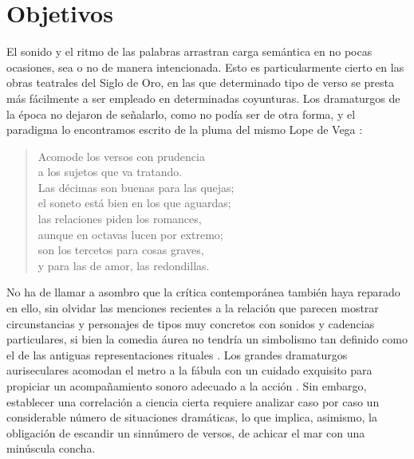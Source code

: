 \section{Objetivos}
El sonido y el ritmo de las palabras arrastran carga semántica en no pocas ocasiones, sea o no de manera intencionada. Esto es particularmente cierto en las obras teatrales del Siglo de Oro, en las que determinado tipo de verso se presta más fácilmente a ser empleado en determinadas coyunturas. Los dramaturgos de la época no dejaron de señalarlo, como no podía ser de otra forma, y el paradigma lo encontramos escrito de la pluma del mismo Lope de Vega \parencite*[305-312]{vega2006}: 
\blockquote{Acomode los versos con prudencia\\
	a los sujetos que va tratando.\\
	Las décimas son buenas para las quejas;\\
	el soneto está bien en los que aguardas;\\
	las relaciones piden los romances,\\
	aunque en octavas lucen por extremo;\\
	son los tercetos para cosas graves,\\
	y para las de amor, las redondillas.}
No ha de llamar a asombro que la crítica contemporánea también haya reparado en ello, sin olvidar las menciones recientes a la relación que parecen mostrar circunstancias y personajes de tipos muy concretos con sonidos \parencites{kroll2020a,kroll2019a}[36]{dominguez2005} y cadencias \parencite{sanchez2017} particulares, si bien la comedia áurea no tendría un simbolismo tan definido como el de las antiguas representaciones rituales \parencite[122]{aichinger2012}. Los grandes dramaturgos auriseculares acomodan el metro a la fábula con un cuidado exquisito para propiciar un acompañamiento sonoro adecuado a la acción \parencite[48-60]{aichinger2015a}. Sin embargo, establecer una correlación a ciencia cierta requiere analizar caso por caso un considerable número de situaciones dramáticas, lo que implica, asimismo, la obligación de escandir un sinnúmero de versos, de achicar el mar con una minúscula concha.

